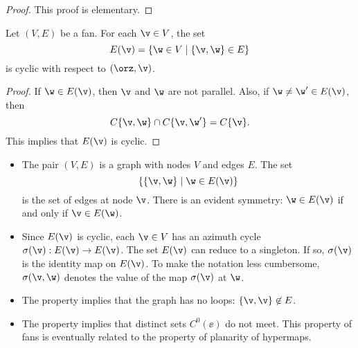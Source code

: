 \begin{proof} This proof is elementary.
\end{proof}

\begin{lemma}  
Let $(V,E)$ be a fan.
For each $\v\in V$, the set
\begin{displaymath}
E(\v) = \{\w\in V\mid \{\v,\w\}\in E\}
\end{displaymath}
is cyclic with respect to $(\orz,\v)$.
\end{lemma}
%

\begin{proof}  If $\w\in E(\v)$, then $\v$ and $\w$ are not parallel.
Also, if $\w\ne \w'\in E(\v)$, then
\begin{displaymath}
C\{\v,\w\}\cap C\{\v,\w'\} = C\{\v\}.
\end{displaymath}
This implies that $E(\v)$ is cyclic.
\end{proof}

\begin{remark}\label{rem:fan}
\begin{itemize}
\item The pair $(V,E)$ is a graph with nodes $V$ and edges $E$.  The set
\begin{displaymath}\{\{\v,\w\}\mid \w\in E(\v)\}\end{displaymath} is
the set of edges at node $\v$.  There is an evident symmetry: $\w\in
E(\v)$ if and only if $\v\in E(\w)$.
%
\item {}%
  Since $E(\v)$ is cyclic, each $\v\in V$ has an azimuth cycle
  $\sigma(\v):E(\v)\to E(\v)$.  The set $E(\v)$ can reduce to a
  singleton. If so, $\sigma(\v)$ is the identity map on $E(\v)$.
%
To make the notation less cumbersome, $\sigma(\v,\w)$ denotes the
value of the map $\sigma(\v)$ at $\w$.
%
\item The property  implies that the graph has no
loops: $\{\v,\v\}\not\in E$.
%
\item The property  implies that distinct sets
$C^0(\ee)$ do not meet.  This property of fans is eventually
related to the property of planarity of hypermaps.
%
%
%
%
\end{itemize}
\end{remark}

